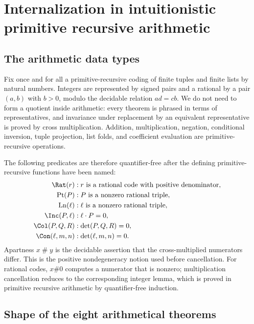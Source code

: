 \section{Internalization in intuitionistic primitive recursive arithmetic}

\subsection{The arithmetic data types}

Fix once and for all a primitive-recursive coding of finite tuples and finite
lists by natural numbers.  Integers are represented by signed pairs and a
rational by a pair $(a,b)$ with $b>0$, modulo the decidable relation
$ad=cb$.  We do not need to form a quotient inside arithmetic: every theorem
is phrased in terms of representatives, and invariance under replacement by
an equivalent representative is proved by cross multiplication.  Addition,
multiplication, negation, conditional inversion, tuple projection, list
folds, and coefficient evaluation are primitive-recursive operations.

The following predicates are therefore quantifier-free after the defining
primitive-recursive functions have been named:
\begin{align*}
 \Rat(r)&: \text{$r$ is a rational code with positive denominator},\\
 \operatorname{Pt}(P)&: \text{$P$ is a nonzero rational triple},\\
 \operatorname{Ln}(\ell)&: \text{$\ell$ is a nonzero rational triple},\\
 \Inc(P,\ell)&: \ell\mathbin{\cdot}P=0,\\
 \Col(P,Q,R)&: \det(P,Q,R)=0,\\
 \Con(\ell,m,n)&: \det(\ell,m,n)=0.
\end{align*}
Apartness $x\mathrel{\#}y$ is the decidable assertion that the
cross-multiplied numerators differ.  This is the positive nondegeneracy notion
used before cancellation.  For rational codes, $x\#0$ computes a numerator
that is nonzero; multiplication cancellation reduces to the corresponding
integer lemma, which is proved in primitive recursive arithmetic by
quantifier-free induction.

\subsection{Shape of the eight arithmetical theorems}


